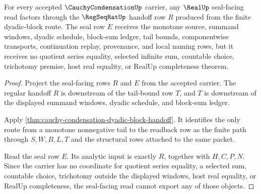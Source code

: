 \begin{theorem}
\label{thm:cauchy-condensation-real-seal-nonescape}
For every accepted $\CauchyCondensationUp$ carrier, any $\RealUp$ seal-facing read factors through the $\RegSeqRatUp$ handoff row $R$ produced from the finite dyadic-block route. The seal row $E$ receives the monotone source, summand windows, dyadic schedule, block-sum ledger, tail bounds, componentwise transports, continuation replay, provenance, and local naming rows, but it receives no quotient series equality, selected infinite sum, countable choice, trichotomy premise, host real equality, or RealUp completeness theorem.
\end{theorem}
\begin{proof}
Project the seal-facing rows $R$ and $E$ from the accepted carrier. The regular handoff $R$ is downstream of the tail-bound row $T$, and $T$ is downstream of the displayed summand windows, dyadic schedule, and block-sum ledger.

Apply \autoref{thm:cauchy-condensation-dyadic-block-handoff}. It identifies the only route from a monotone nonnegative tail to the readback row as the finite path through $S,W,B,L,T$ and the structural rows attached to the same packet.

Read the seal row $E$. Its analytic input is exactly $R$, together with $H,C,P,N$. Since the carrier has no coordinate for quotient series equality, a selected sum, countable choice, trichotomy outside the displayed windows, host real equality, or RealUp completeness, the seal-facing read cannot export any of those objects.
\end{proof}

